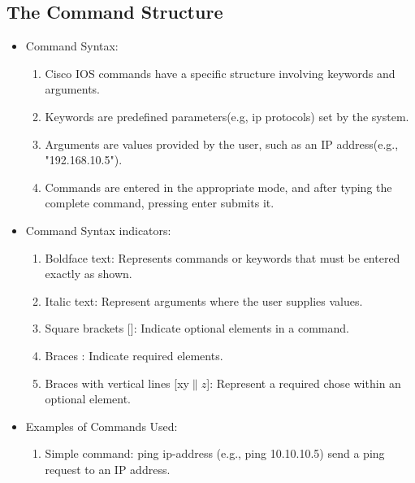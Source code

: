 \documentclass[a4paper,11pt]{article}
\begin{document}
\subsection{The Command Structure}
\begin{itemize}
    \item Command Syntax:\\
    \begin{enumerate}
        \item Cisco IOS commands have a specific structure involving keywords and arguments.\\
        \item Keywords are predefined parameters(e.g, ip protocols) set by the system.\\
        \item Arguments are values provided by the user, such as an IP address(e.g., "192.168.10.5").\\
        \item Commands are entered in the appropriate mode, and after typing the complete command, pressing enter submits it.\\
    \end{enumerate}
    \item Command Syntax indicators:\\
    \begin{enumerate}
        \item Boldface text: Represents commands or keywords that must be entered exactly as shown.\\
        \item Italic text: Represent arguments where the user supplies values.\\
        \item Square brackets []: Indicate optional elements in a command.\\
        \item Braces {}: Indicate required elements.\\
        \item Braces with vertical lines [x{y$\|z$}]: Represent a required chose within an optional element.\\
    \end{enumerate}
    \item Examples of Commands Used:\\
    \begin{enumerate}
        \item Simple command: ping ip-address (e.g., ping 10.10.10.5) send a ping request to an IP address.\\

\end{enumerate}
\end{itemize}
\end{document}
